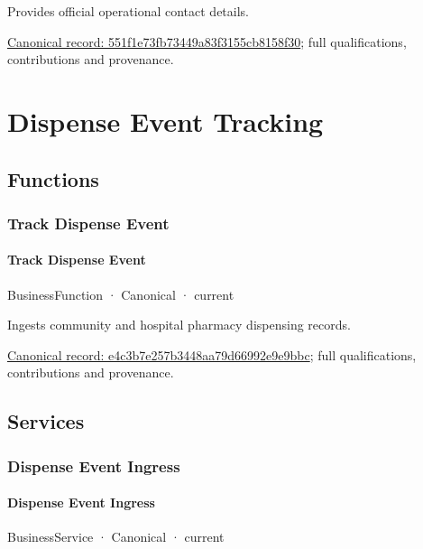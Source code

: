 Provides official operational contact details.


{\footnotesize \href{../../../../continuum/business/business-service/551f1e73fb73449a83f3155cb8158f30.md}{Canonical record: 551f1e73fb73449a83f3155cb8158f30}; full qualifications, contributions and provenance.}\par
\section{Dispense Event Tracking}

\subsection{Functions}

\subsubsection{Track Dispense Event}

\paragraph{Track Dispense Event}

\label{element:e4c3b7e257b3448aa79d66992e9e9bbc}
{\small BusinessFunction · Canonical · current}\par

Ingests community and hospital pharmacy dispensing records.


{\footnotesize \href{../../../../continuum/business/business-function/e4c3b7e257b3448aa79d66992e9e9bbc.md}{Canonical record: e4c3b7e257b3448aa79d66992e9e9bbc}; full qualifications, contributions and provenance.}\par
\subsection{Services}

\subsubsection{Dispense Event Ingress}

\paragraph{Dispense Event Ingress}

\label{element:b81512ca8e36434e9fa29493e645d31d}
{\small BusinessService · Canonical · current}\par

